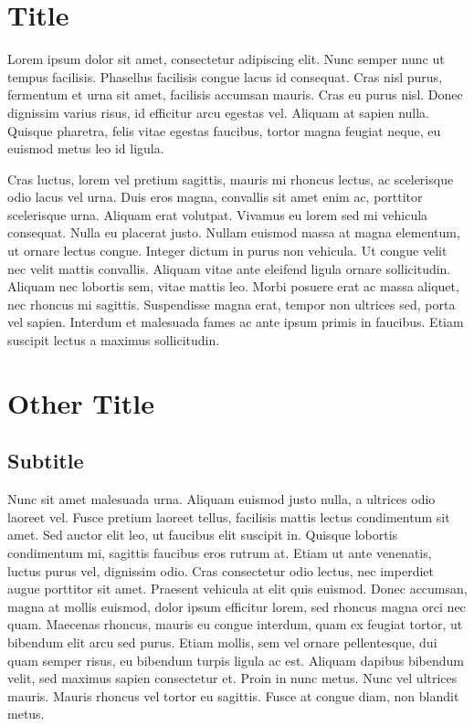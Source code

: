 \section{Title}
Lorem ipsum dolor sit amet, consectetur adipiscing elit. Nunc semper nunc ut tempus facilisis. Phasellus facilisis congue lacus id consequat. Cras nisl purus, fermentum et urna sit amet, facilisis accumsan mauris. Cras eu purus nisl. Donec dignissim varius risus, id efficitur arcu egestas vel. Aliquam at sapien nulla. Quisque pharetra, felis vitae egestas faucibus, tortor magna feugiat neque, eu euismod metus leo id ligula.\par 
Cras luctus, lorem vel pretium sagittis, mauris mi rhoncus lectus, ac scelerisque odio lacus vel urna. Duis eros magna, convallis sit amet enim ac, porttitor scelerisque urna. Aliquam erat volutpat. Vivamus eu lorem sed mi vehicula consequat. Nulla eu placerat justo. Nullam euismod massa at magna elementum, ut ornare lectus congue. Integer dictum in purus non vehicula. Ut congue velit nec velit mattis convallis. Aliquam vitae ante eleifend ligula ornare sollicitudin. Aliquam nec lobortis sem, vitae mattis leo. Morbi posuere erat ac massa aliquet, nec rhoncus mi sagittis. Suspendisse magna erat, tempor non ultrices sed, porta vel sapien. Interdum et malesuada fames ac ante ipsum primis in faucibus. Etiam suscipit lectus a maximus sollicitudin.
\section{Other Title}
\subsection{Subtitle}
Nunc sit amet malesuada urna. Aliquam euismod justo nulla, a ultrices odio laoreet vel. Fusce pretium laoreet tellus, facilisis mattis lectus condimentum sit amet. Sed auctor elit leo, ut faucibus elit suscipit in. Quisque lobortis condimentum mi, sagittis faucibus eros rutrum at. Etiam ut ante venenatis, luctus purus vel, dignissim odio. Cras consectetur odio lectus, nec imperdiet augue porttitor sit amet. Praesent vehicula at elit quis euismod. Donec accumsan, magna at mollis euismod, dolor ipsum efficitur lorem, sed rhoncus magna orci nec quam. Maecenas rhoncus, mauris eu congue interdum, quam ex feugiat tortor, ut bibendum elit arcu sed purus. Etiam mollis, sem vel ornare pellentesque, dui quam semper risus, eu bibendum turpis ligula ac est. Aliquam dapibus bibendum velit, sed maximus sapien consectetur et. Proin in nunc metus. Nunc vel ultrices mauris. Mauris rhoncus vel tortor eu sagittis. Fusce at congue diam, non blandit metus.\autocite[cp.][pp. 1-20]{jw}
